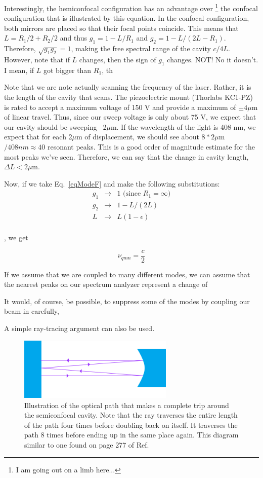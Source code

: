 Interestingly, the hemiconfocal configuration has an advantage over \footnote{I am going out on a limb here...} the confocal configuration that is illustrated by this equation. In the confocal configuration, both mirrors are placed so that their focal points coincide. This means that $L=R_1/2+R_2/2$ and thus $g_1=1-L/R_1$ and $g_2=1-L/(2L-R_1)$. Therefore, $\sqrt{g_1g_2}=1$, making the free spectral range of the cavity $c/4L$. However, note that if $L$ changes, then the sign of $g_1$ changes. NOT! No it doesn't. I mean, if $L$ got bigger than $R_1$, th

Note that we are note actually scanning the frequency of the laser. Rather, it is the length of the cavity that scans. The piezoelectric mount (Thorlabs KC1-PZ) is rated to accept a maximum voltage of 150 V and provide a maximum of $\pm4\mu$m of linear travel. Thus, since our sweep voltage is only about 75 V, we expect that our cavity should be sweeping ~2$\mu$m. If the wavelength of the light is 408 nm, we expect that for each 2$\mu$m of displacement, we should see about $8*2\mu$m$/408nm \approx 40$ resonant peaks. This is a good order of magnitude estimate for the most peaks we've seen. Therefore, we can say that the change in cavity length, $\Delta L< 2\mu$m.

Now, if we take Eq.\ \ref{eqModeF} and make the following substitutions:
\begin{align}
g_1&\rightarrow&1 \text{ (since $R_1=\infty$)} \\
g_2&\rightarrow& 1-L/(2L)\\
L&\rightarrow& L(1-\epsilon)\\
\end{align}

, we get 

\begin{equation}
\nu_{qmn}=\frac{c}{2}
\end{equation}




If we assume that we are coupled to many different modes, we can assume that the nearest peaks on our spectrum analyzer represent a change of 

It would, of course, be possible, to suppress some of the modes by coupling our beam in carefully, 

A simple ray-tracing argument can also be used. 
\begin{figure}
\centerline{\includegraphics[height=3cm]{spectrum_analyzer_path.png}}
\caption{Illustration of the optical path that makes a complete trip around the semiconfocal cavity. Note that the ray traverses the entire length of the path four times before doubling back on itself. It traverses the path 8 times before ending up in the same place again. This diagram similar to one found on page 277 of Ref.\ \cite{lasersMilonniEberly}}
\end{figure}

